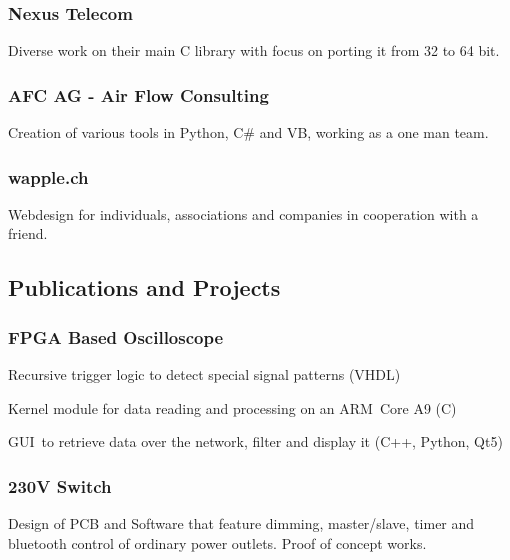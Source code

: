 \documentclass[]{resume}
\begin{document}
\begin{timeline}
\subsubsection{Nexus Telecom}
Diverse work on their main C library with focus on porting it from 32 to 64 bit.
\sectionsep

\subsubsection{AFC AG - Air Flow Consulting}
Creation of various tools in Python, C\# and VB, working as a one man team.
\sectionsep

\subsubsection{wapple.ch}
Webdesign for individuals, associations and companies in cooperation with a friend.
\sectionsep


\subsection{Publications and Projects}

\subsubsection{FPGA Based Oscilloscope}
\vspace{\topsep} %
\begin{tightemize}
\item Recursive trigger logic to detect special signal patterns (VHDL)
\item Kernel module for data reading and processing on an ARM Core A9 (C)
\item GUI to retrieve data over the network, filter and display it (C++, Python, Qt5)
\end{tightemize}
\sectionsep

\subsubsection{230V Switch}
Design of PCB and Software that feature dimming, master/slave, timer and bluetooth control of ordinary power outlets. Proof of concept works.
\sectionsep


\end{timeline}
\end{document}
